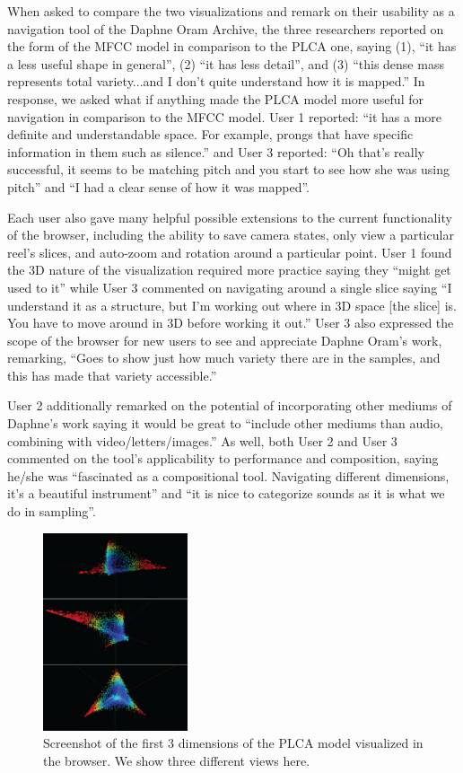 \documentclass[a4paper,10pt,final]{ThesisStyle}
\begin{document}
When asked to compare the two visualizations and remark on their usability as a navigation tool of the Daphne Oram Archive, the three researchers reported on the form of the MFCC model in comparison to the PLCA one, saying (1), ``it has a less useful shape in general'', (2) ``it has less detail'', and (3) ``this dense mass represents total variety...and I don't quite understand how it is mapped.''  In response, we asked what if anything made the PLCA model more useful for navigation in comparison to the MFCC model.  User 1 reported: ``it has a more definite and understandable space. For example, prongs that have specific information in them such as silence.'' and User 3 reported: ``Oh that's really successful, it seems to be matching pitch and you start to see how she was using pitch'' and ``I had a clear sense of how it was mapped''. 

Each user also gave many helpful possible extensions to the current functionality of the browser, including the ability to save camera states, only view a particular reel's slices, and auto-zoom and rotation around a particular point.  User 1 found the 3D nature of the visualization required more practice saying they ``might get used to it'' while User 3 commented on navigating around a single slice saying ``I understand it as a structure, but I'm working out where in 3D space [the slice] is.  You have to move around in 3D before working it out.''   User 3 also expressed the scope of the browser for new users to see and appreciate Daphne Oram's work, remarking, ``Goes to show just how much variety there are in the samples, and this has made that variety accessible.''  

User 2 additionally remarked on the potential of incorporating other mediums of Daphne's work saying it would be great to ``include other mediums than audio, combining with video/letters/images.''  As well, both User 2 and User 3 commented on the tool's applicability to performance and composition, saying he/she was ``fascinated as a compositional tool.  Navigating different dimensions, it's a beautiful instrument'' and ``it is nice to categorize sounds as it is what we do in sampling''.  

\begin{figure}
  \centering
  \includegraphics[width=0.38\textwidth]{images/plca-all.png}
  \caption{Screenshot of the first 3 dimensions of the PLCA model visualized in the browser.  We show three different views here.}
  \label{fig:plca}
\end{figure}
\end{document}
